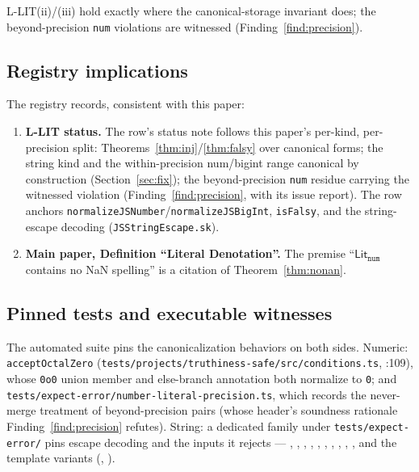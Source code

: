 \documentclass[11pt]{article}
\newcommand{\Lit}[1]{\mathsf{Lit}_{\texttt{#1}}}
\begin{document}
L-LIT(ii)/(iii) hold exactly where the canonical-storage invariant
does; the beyond-precision \texttt{num} violations are witnessed
(Finding~\ref{find:precision}).

\subsection{Registry implications}

The registry records, consistent with this paper:
\begin{enumerate}
\item \textbf{L-LIT status.} The row's status note follows this paper's
  per-kind, per-precision split: Theorems~\ref{thm:inj}/\ref{thm:falsy}
  over canonical forms; the string kind and the within-precision
  num/bigint range canonical by construction (Section~\ref{sec:fix});
  the beyond-precision \texttt{num} residue carrying the witnessed
  violation (Finding~\ref{find:precision}, with its issue report). The
  row anchors \texttt{normalizeJSNumber}/\texttt{normalizeJSBigInt},
  \texttt{isFalsy}, and the string-escape decoding
  (\texttt{JSStringEscape.sk}).
\item \textbf{Main paper, Definition ``Literal Denotation''.} The
  premise ``$\Lit{num}$ contains no NaN spelling'' is a citation of
  Theorem~\ref{thm:nonan}.
\end{enumerate}

\subsection{Pinned tests and executable witnesses}
\label{sec:tests}

The automated suite pins the canonicalization behaviors on both sides.
Numeric: \texttt{acceptOctalZero}
(\texttt{tests/projects/truthiness-safe/src/conditions.ts}, :109),
whose \texttt{0o0} union member and else-branch annotation both
normalize to \texttt{0}; and
\texttt{tests/expect-error/number-literal-precision.ts}, which records
the never-merge treatment of beyond-precision pairs (whose header's
soundness rationale Finding~\ref{find:precision} refutes). String: a
dedicated family under \texttt{tests/expect-error/} pins escape
decoding and the inputs it rejects ---
,
,
,
,
,
,
,
,
,
, and the template variants
(,
).
\end{document}
